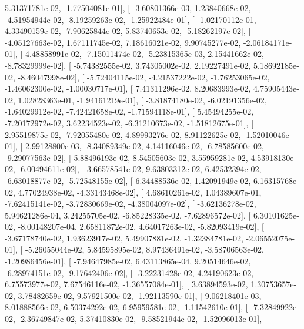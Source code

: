 \documentclass{article}
\begin{document}
          5.31371781e-02,  -1.77504081e-01],
       [ -3.60801366e-03,   1.23840668e-02,  -4.51954944e-02,
         -8.19259263e-02,  -1.25922484e-01],
       [ -1.02170112e-01,   4.33490159e-02,  -7.90625844e-02,
          5.83740653e-02,  -5.18262197e-02],
       [ -4.05127663e-02,   1.67111745e-02,   7.18616021e-02,
          9.90745277e-02,  -2.06184171e-01],
       [  4.48858991e-02,  -7.15011474e-02,  -5.23815365e-03,
          2.15441662e-02,  -8.78329999e-02],
       [ -5.74382555e-02,   3.74305002e-02,   2.19227491e-02,
          5.18692185e-02,  -8.46047998e-02],
       [ -5.72404115e-02,  -4.21537222e-02,  -1.76253065e-02,
         -1.46062300e-02,  -1.00030717e-01],
       [  7.41311296e-02,   8.20683993e-02,   4.75905443e-02,
          1.02828363e-01,  -1.94161219e-01],
       [ -3.81874180e-02,  -6.02191356e-02,  -1.64029912e-02,
         -7.42421658e-02,  -1.71594118e-01],
       [  5.45494255e-02,  -7.20172972e-02,   3.62234523e-02,
         -6.31210673e-02,  -1.51812675e-01],
       [  2.95519875e-02,  -7.92055480e-02,   4.89993276e-02,
          8.91122625e-02,  -1.52010046e-01],
       [  2.99128800e-03,  -8.34089349e-02,   4.14116046e-02,
         -6.78585600e-02,  -9.29077563e-02],
       [  5.88496193e-02,   8.54505603e-02,   3.55959281e-02,
          4.53918130e-02,  -6.00494611e-02],
       [  3.66578541e-02,   9.63803312e-02,   6.42532394e-02,
         -6.63018877e-02,  -5.72548155e-02],
       [  6.34488536e-02,   1.42091949e-02,   6.16315768e-02,
          4.77024938e-02,  -4.33143468e-02],
       [  4.68610261e-02,   1.04389607e-01,  -7.62415141e-02,
         -3.72830669e-02,  -4.38004097e-02],
       [ -3.62136278e-02,   5.94621286e-04,   3.24255705e-02,
         -6.85228335e-02,  -7.62896572e-02],
       [  6.30101625e-02,  -8.00148207e-04,   2.65811872e-02,
          4.64017263e-02,  -5.82093419e-02],
       [ -3.67178740e-02,   1.93623917e-02,   5.49907881e-02,
         -1.32384781e-02,  -2.06552075e-01],
       [ -5.26055044e-02,   5.84595895e-02,   8.97436491e-02,
         -3.58706563e-02,  -1.20986456e-01],
       [ -7.94647985e-02,   6.43113865e-04,   9.20514646e-02,
         -6.28974151e-02,  -9.17642406e-02],
       [ -3.22231428e-02,   4.24190623e-02,   6.75573977e-02,
          7.67546116e-02,  -1.36557084e-01],
       [  3.63894593e-02,   1.30753657e-02,   3.78482659e-02,
          9.57921500e-02,  -1.92113590e-01],
       [  9.06218401e-03,   8.01888566e-02,   6.50374292e-02,
          6.95959581e-02,  -1.11542610e-01],
       [ -7.32849922e-02,  -2.36749847e-02,   5.37410830e-02,
         -9.58521944e-02,  -1.52096013e-01],
\end{document}
